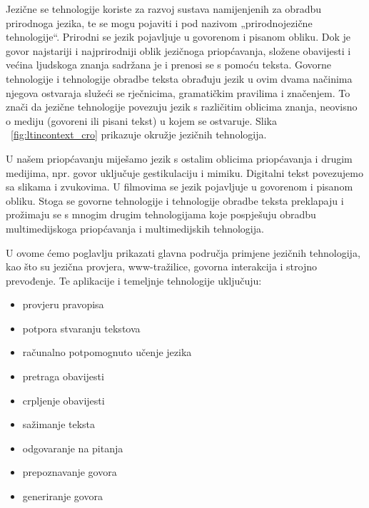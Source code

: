 \clearpage



\begin{multicols}{2}
Jezične se tehnologije koriste za razvoj sustava namijenjenih za obradbu prirodnoga jezika, te se mogu pojaviti i pod nazivom „prirodnojezične tehnologije“. Prirodni se jezik pojavljuje u govorenom i pisanom obliku. Dok je govor najstariji i najprirodniji oblik jezičnoga priopćavanja, složene obavijesti i većina ljudskoga znanja sadržana je i prenosi se s pomoću teksta. Govorne tehnologije i tehnologije obradbe teksta obrađuju jezik u ovim dvama načinima njegova ostvaraja služeći se rječnicima, gramatičkim pravilima i značenjem. To znači da jezične tehnologije povezuju jezik s različitim oblicima znanja, neovisno o mediju (govoreni ili pisani tekst) u kojem se ostvaruje. Slika ~\ref{fig:ltincontext_cro} prikazuje okružje jezičnih tehnologija.

U našem priopćavanju miješamo jezik s ostalim oblicima priopćavanja i drugim medijima, npr. govor uključuje gestikulaciju i mimiku. Digitalni tekst povezujemo sa slikama i zvukovima. U filmovima se jezik pojavljuje u govorenom i pisanom obliku. Stoga se govorne tehnologije i tehnologije obradbe teksta preklapaju i prožimaju se s mnogim drugim tehnologijama koje pospješuju obradbu multimedijskoga priopćavanja i multimedijskih tehnologija.

U ovome ćemo poglavlju prikazati glavna područja primjene jezičnih tehnologija, kao što su jezična provjera, www-tražilice, govorna interakcija i strojno prevođenje. Te aplikacije i temeljnje tehnologije uključuju:
\begin{itemize}
\item provjeru pravopisa
\item potpora stvaranju tekstova
\item računalno potpomognuto učenje jezika
\item pretraga obavijesti
\item crpljenje obavijesti
\item sažimanje teksta
\item odgovaranje na pitanja
\item prepoznavanje govora
\item generiranje govora
\end{itemize}


\end{multicols}
